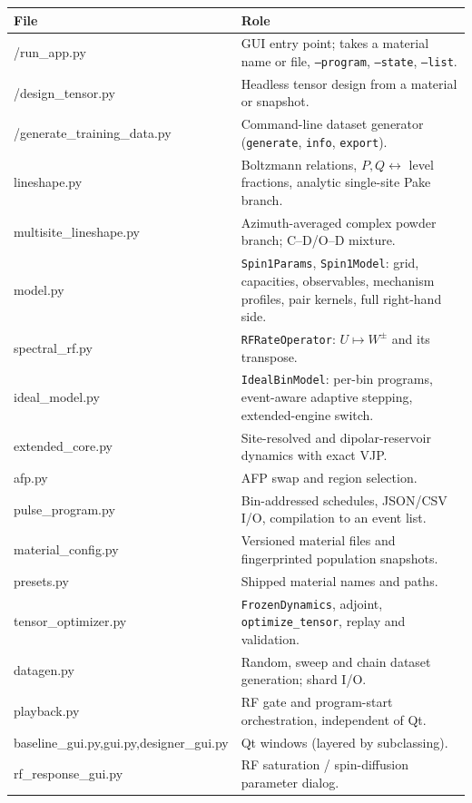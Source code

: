 \documentclass[11pt]{article}
\begin{document}
\begin{center}\small
\begin{tabularx}{0.96\textwidth}{>{\ttfamily}L{0.33\textwidth} X}
\toprule
File & Role\\
\midrule
/run\_app.py & GUI entry point; takes a material name or file, \texttt{--program}, \texttt{--state}, \texttt{--list}.\\
/design\_tensor.py & Headless tensor design from a material or snapshot.\\
/generate\_training\_data.py & Command-line dataset generator (\texttt{generate}, \texttt{info}, \texttt{export}).\\
lineshape.py & Boltzmann relations, \(P,Q\leftrightarrow\) level fractions, analytic single-site Pake branch.\\
multisite\_lineshape.py & Azimuth-averaged complex powder branch; C--D/O--D mixture.\\
model.py & \texttt{Spin1Params}, \texttt{Spin1Model}: grid, capacities, observables, mechanism profiles, pair kernels, full right-hand side.\\
spectral\_rf.py & \texttt{RFRateOperator}: \(U\mapsto W^\pm\) and its transpose.\\
ideal\_model.py & \texttt{IdealBinModel}: per-bin programs, event-aware adaptive stepping, extended-engine switch.\\
extended\_core.py & Site-resolved and dipolar-reservoir dynamics with exact VJP.\\
afp.py & AFP swap and region selection.\\
pulse\_program.py & Bin-addressed schedules, JSON/CSV I/O, compilation to an event list.\\
material\_config.py & Versioned material files and fingerprinted population snapshots.\\
presets.py & Shipped material names and paths.\\
tensor\_optimizer.py & \texttt{FrozenDynamics}, adjoint, \texttt{optimize\_tensor}, replay and validation.\\
datagen.py & Random, sweep and chain dataset generation; shard I/O.\\
playback.py & RF gate and program-start orchestration, independent of Qt.\\
baseline\_gui.py,\newline gui.py,\newline designer\_gui.py & Qt windows (layered by subclassing).\\
rf\_response\_gui.py & RF saturation / spin-diffusion parameter dialog.\\

\end{tabularx}
\end{center}
\end{document}
